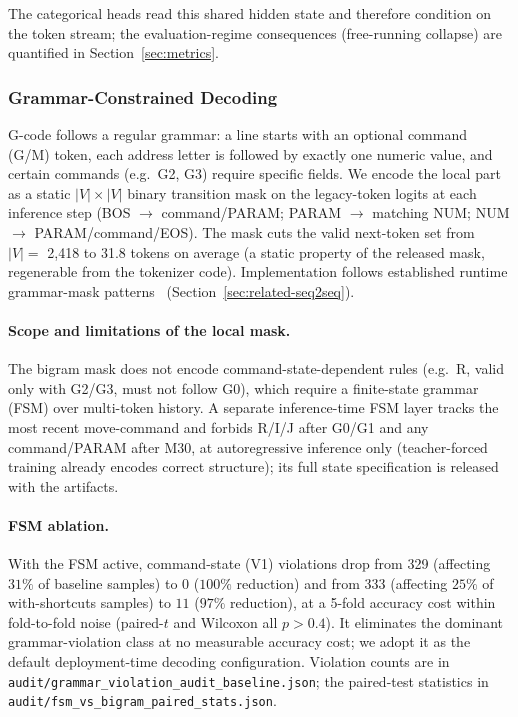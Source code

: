 \documentclass[sensors,article,submit,moreauthors,pdftex]{Definitions/mdpi}
\begin{document}
The categorical heads read this shared hidden state and therefore condition on the token stream; the evaluation-regime consequences (free-running collapse) are quantified in Section~\ref{sec:metrics}.

\subsubsection{Grammar-Constrained Decoding}
\label{sec:grammar}

G-code follows a regular grammar: a line starts with an optional command (G/M) token, each address letter is followed by exactly one numeric value, and certain commands (e.g.\ G2, G3) require specific fields. We encode the local part as a static $|V| \times |V|$ binary transition mask on the legacy-token logits at each inference step (BOS $\to$ command/PARAM; PARAM $\to$ matching NUM; NUM $\to$ PARAM/command/EOS). The mask cuts the valid next-token set from $|V|=$ 2{,}418 to 31.8 tokens on average (a static property of the released mask, regenerable from the tokenizer code). Implementation follows established runtime grammar-mask patterns~\cite{picard,synchromesh,lmql,outlines,xgrammar,geng2023gcd} (Section~\ref{sec:related-seq2seq}).

\paragraph{Scope and limitations of the local mask.} The bigram mask does not encode command-state-dependent rules (e.g.\ R, valid only with G2/G3, must not follow G0), which require a finite-state grammar (FSM) over multi-token history. A separate inference-time FSM layer tracks the most recent move-command and forbids R/I/J after G0/G1 and any command/PARAM after M30, at autoregressive inference only (teacher-forced training already encodes correct structure); its full state specification is released with the artifacts.

\paragraph{FSM ablation.} With the FSM active, command-state (V1) violations drop from 329 (affecting $31\%$ of baseline samples) to $0$ ($100\%$ reduction) and from 333 (affecting $25\%$ of with-shortcuts samples) to $11$ ($97\%$ reduction), at a 5-fold accuracy cost within fold-to-fold noise (paired-$t$ and Wilcoxon all $p>0.4$). It eliminates the dominant grammar-violation class at no measurable accuracy cost; we adopt it as the default deployment-time decoding configuration. Violation counts are in \texttt{audit/grammar\_violation\_audit\_baseline.json}; the paired-test statistics in \texttt{audit/fsm\_vs\_bigram\_paired\_stats.json}.
\end{document}

